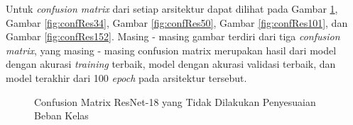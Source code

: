 Untuk \emph{confusion matrix} dari setiap arsitektur dapat dilihat pada Gambar \ref{fig:confRes18}, Gambar \ref{fig:confRes34}, Gambar \ref{fig:confRes50}, Gambar \ref{fig:confRes101}, dan Gambar \ref{fig:confRes152}. Masing - masing gambar terdiri dari tiga \emph{confusion matrix}, yang masing - masing confusion matrix merupakan hasil dari model dengan akurasi \emph{training} terbaik, model dengan akurasi validasi terbaik, dan model terakhir dari 100 \emph{epoch} pada arsitektur tersebut.

\begin{figure}[hbtp]
	\centering
	\qquad
	\qquad
	\caption{Confusion Matrix ResNet-18 yang Tidak Dilakukan Penyesuaian Beban Kelas}
	\label{fig:confRes18}
\end{figure}

